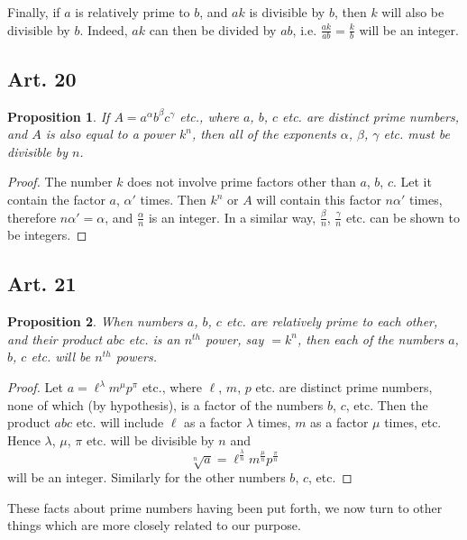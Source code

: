 \documentclass{book}
\theoremstyle{plain}
\newtheorem{proposition}{Proposition}
\theoremstyle{remark}
\begin{document}
Finally, if $a$ is relatively prime to $b$, and $ak$ is divisible by $b$, then $k$ will also be divisible by $b$.  Indeed, $ak$ can then be divided by $ab$, i.e. $\frac{ak}{ab} = \frac{k}{b}$ will be an integer.

\subsection*{Art. 20}

\begin{proposition} If $A = a^{\alpha}b^{\beta}c^{\gamma}$ etc., where $a$, $b$, $c$ etc. are distinct prime numbers, and $A$ is also equal to a power $k^n$, then all of the exponents $\alpha$, $\beta$, $\gamma$ etc. must be divisible by $n$. \end{proposition}

\begin{proof} The number $k$ does not involve prime factors other than $a$, $b$, $c$.   Let it contain the factor $a$, $\alpha'$ times.  Then $k^n$ or $A$ will contain this factor $n\alpha'$ times, therefore $n\alpha' = \alpha$, and $\frac{\alpha}{n}$ is an integer.  In a similar way, $\frac{\beta}{n}$, $\frac{\gamma}{n}$ etc. can be shown to be integers. \end{proof}

\subsection*{Art. 21} 
\begin{proposition} When numbers $a$, $b$, $c$ etc. are relatively prime to each other, and their product $abc$ etc. is an $n^{th}$ power, say $=k^n$, then each of the numbers $a$, $b$, $c$ etc. will be $n^{th}$ powers. \end{proposition}
\begin{proof} 
Let $a = \ell^{\lambda} m^{\mu} p^{\pi}$ etc., where $\ell$, $m$, $p$ etc. are distinct prime numbers, none of which (by hypothesis), is a factor of the numbers $b$, $c$, etc.  Then the product $abc$ etc. will include  $\ell$  as a factor $\lambda$ times, $m$ as a factor $\mu$ times, etc.  Hence $\lambda$, $\mu$, $\pi$ etc. will be divisible by $n$ and 
\[ \sqrt[n]{a} = \ell^{\frac{\lambda}{n}} m^{\frac{\mu}{n}} p^{\frac{\pi}{n}} \]
will be an integer.  Similarly for the other numbers $b$, $c$, etc. 
\end{proof}
These facts about prime numbers having been put forth, we now turn to other things which are more closely related to our purpose.
\end{document}
